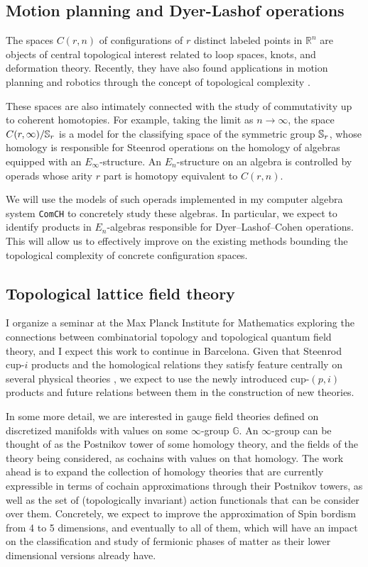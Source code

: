 \subsection{Motion planning and Dyer-Lashof operations}

The spaces $C(r,n)$ of configurations of $r$ distinct labeled points in $\mathbb R^n$ are objects of central topological interest related to loop spaces, knots, and deformation theory.
Recently, they have also found applications in motion planning and robotics through the concept of topological complexity \cite{farber2003motion-planning}.

These spaces are also intimately connected with the study of commutativity up to coherent homotopies.
For example, taking the limit as $n \to \infty$, the space $C(r, \infty)/\S_r$ is a model for the classifying space of the symmetric group $\S_r$, whose homology is responsible for Steenrod operations on the homology of algebras equipped with an $E_\infty$-structure.
An $E_n$-structure on an algebra is controlled by operads whose arity $r$ part is homotopy equivalent to $C(r,n)$.

We will use the models of such operads implemented in my computer algebra system \texttt{ComCH} \cite{medina2021computer} to concretely study these algebras.
In particular, we expect to identify products in $E_n$-algebras responsible for Dyer--Lashof--Cohen operations.
This will allow us to effectively improve on the existing methods bounding the topological complexity of concrete configuration spaces.

\subsection{Topological lattice field theory} \label{ss:physics}

I organize a seminar at the Max Planck Institute for Mathematics exploring the connections between combinatorial topology and topological quantum field theory, and I expect this work to continue in Barcelona.
Given that Steenrod cup-$i$ products and the homological relations they satisfy feature centrally on several physical theories \cite{gaiotto2016spin, kapustin2017fermionic}, we expect to use the newly introduced cup-$(p,i)$ products and future relations between them in the construction of new theories.

In some more detail, we are interested in gauge field theories defined on discretized manifolds with values on some $\infty$-group $\mathbb G$.
An $\infty$-group can be thought of as the Postnikov tower of some homology theory, and the fields of the theory being considered, as cochains with values on that homology.
The work ahead is to expand the collection of homology theories that are currently expressible in terms of cochain approximations through their Postnikov towers, as well as the set of (topologically invariant) action functionals that can be consider over them.
Concretely, we expect to improve the approximation of Spin bordism from 4 to 5 dimensions, and eventually to all of them, which will have an impact on the classification and study of fermionic phases of matter as their lower dimensional versions already have.

